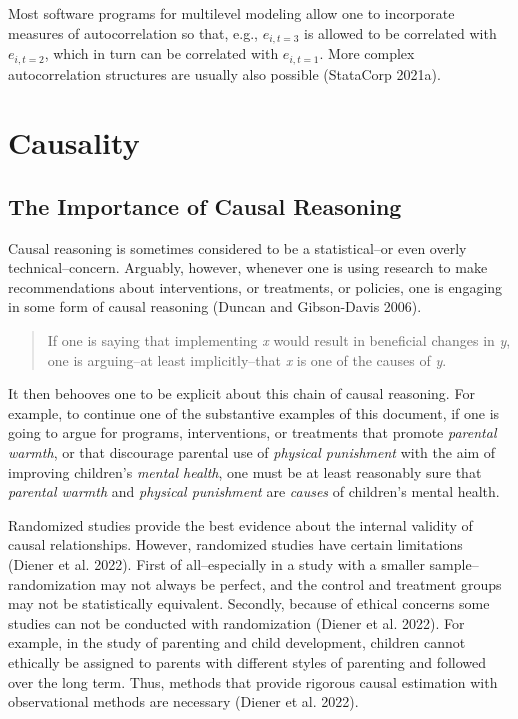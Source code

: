 \documentclass[
  letterpaper,
  DIV=11,
  numbers=noendperiod]{scrreprt}
\begin{document}
Most software programs for multilevel modeling allow one to incorporate
measures of autocorrelation so that, e.g., \(e_{i,t=3}\) is allowed to
be correlated with \(e_{i,t=2}\), which in turn can be correlated with
\(e_{i,t=1}\). More complex autocorrelation structures are usually also
possible (StataCorp 2021a).

\hypertarget{causality}{%
\section{Causality}\label{causality}}

\hypertarget{the-importance-of-causal-reasoning}{%
\subsection{The Importance of Causal
Reasoning}\label{the-importance-of-causal-reasoning}}

Causal reasoning is sometimes considered to be a statistical--or even
overly technical--concern. Arguably, however, whenever one is using
research to make recommendations about interventions, or treatments, or
policies, one is engaging in some form of causal reasoning (Duncan and
Gibson-Davis 2006).

\begin{quote}
If one is saying that implementing \emph{x} would result in beneficial
changes in \emph{y}, one is arguing--at least implicitly--that \emph{x}
is one of the causes of \emph{y}.
\end{quote}

It then behooves one to be explicit about this chain of causal
reasoning. For example, to continue one of the substantive examples of
this document, if one is going to argue for programs, interventions, or
treatments that promote \emph{parental warmth}, or that discourage
parental use of \emph{physical punishment} with the aim of improving
children's \emph{mental health}, one must be at least reasonably sure
that \emph{parental warmth} and \emph{physical punishment} are
\emph{causes} of children's mental health.

Randomized studies provide the best evidence about the internal validity
of causal relationships. However, randomized studies have certain
limitations (Diener et al. 2022). First of all--especially in a study
with a smaller sample--randomization may not always be perfect, and the
control and treatment groups may not be statistically equivalent.
Secondly, because of ethical concerns some studies can not be conducted
with randomization (Diener et al. 2022). For example, in the study of
parenting and child development, children cannot ethically be assigned
to parents with different styles of parenting and followed over the long
term. Thus, methods that provide rigorous causal estimation with
observational methods are necessary (Diener et al. 2022).
\end{document}
